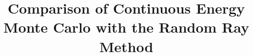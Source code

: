 \documentclass{style/nseJournal}
\begin{document}
\title{Comparison of Continuous Energy Monte Carlo with the Random Ray Method} %




\titlePage

%






\pagebreak


\pagebreak

\end{document}
